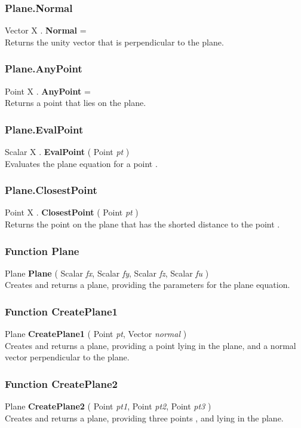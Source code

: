 \subsubsection{Plane.Normal \label{F:Plane:Normal}}
Vector X . \textbf{Normal} = \\
Returns the unity vector that is perpendicular to the plane.

\subsubsection{Plane.AnyPoint \label{F:Plane:AnyPoint}}
Point X . \textbf{AnyPoint} = \\
Returns a point that lies on the plane.

\subsubsection{Plane.EvalPoint \label{F:Plane:EvalPoint}}
Scalar X . \textbf{EvalPoint} ( Point \textit{pt} ) \\
Evaluates the plane equation for a point .

\subsubsection{Plane.ClosestPoint \label{F:Plane:ClosestPoint}}
Point X . \textbf{ClosestPoint} ( Point \textit{pt} ) \\
Returns the point on the plane that has the shorted distance to the point .

\subsubsection{Function Plane \label{F:Plane}}
Plane \textbf{Plane} ( Scalar \textit{fx}, Scalar \textit{fy}, Scalar \textit{fz}, Scalar \textit{fu} ) \\
Creates and returns a plane, providing the parameters for the plane equation.

\subsubsection{Function CreatePlane1 \label{F:CreatePlane1}}
Plane \textbf{CreatePlane1} ( Point \textit{pt}, Vector \textit{normal} ) \\
Creates and returns a plane, providing a point  lying in the plane, and a normal vector  perpendicular to the plane.

\subsubsection{Function CreatePlane2 \label{F:CreatePlane2}}
Plane \textbf{CreatePlane2} ( Point \textit{pt1}, Point \textit{pt2}, Point \textit{pt3} ) \\
Creates and returns a plane, providing three points ,  and  lying in the plane.

